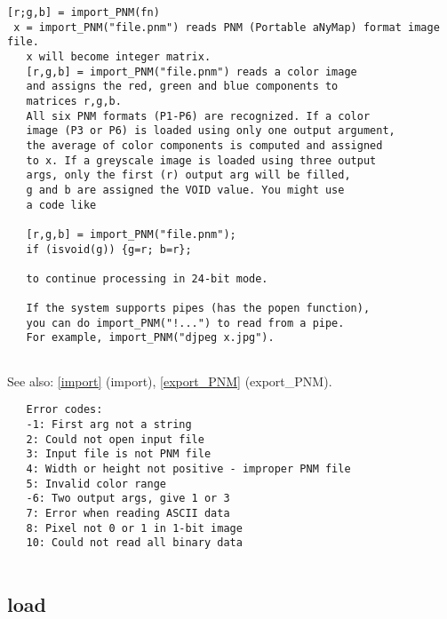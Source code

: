 \documentclass[a4paper]{article}
\begin{document}
\begin{tscreen}
\begin{verbatim}
[r;g,b] = import_PNM(fn)
 x = import_PNM("file.pnm") reads PNM (Portable aNyMap) format image file.
   x will become integer matrix.
   [r,g,b] = import_PNM("file.pnm") reads a color image
   and assigns the red, green and blue components to
   matrices r,g,b.
   All six PNM formats (P1-P6) are recognized. If a color
   image (P3 or P6) is loaded using only one output argument,
   the average of color components is computed and assigned
   to x. If a greyscale image is loaded using three output
   args, only the first (r) output arg will be filled,
   g and b are assigned the VOID value. You might use
   a code like

   [r,g,b] = import_PNM("file.pnm");
   if (isvoid(g)) {g=r; b=r};

   to continue processing in 24-bit mode.

   If the system supports pipes (has the popen function),
   you can do import_PNM("!...") to read from a pipe.
   For example, import_PNM("djpeg x.jpg").
   
\end{verbatim}

See also: \ref{import} {(import)}, \ref{export_PNM} {(export\_PNM)}.
\begin{verbatim}
   Error codes:
   -1: First arg not a string
   2: Could not open input file
   3: Input file is not PNM file
   4: Width or height not positive - improper PNM file
   5: Invalid color range
   -6: Two output args, give 1 or 3
   7: Error when reading ASCII data
   8: Pixel not 0 or 1 in 1-bit image
   10: Could not read all binary data
   
\end{verbatim}
\end{tscreen}



\subsection{load\label{load}}
\end{document}
